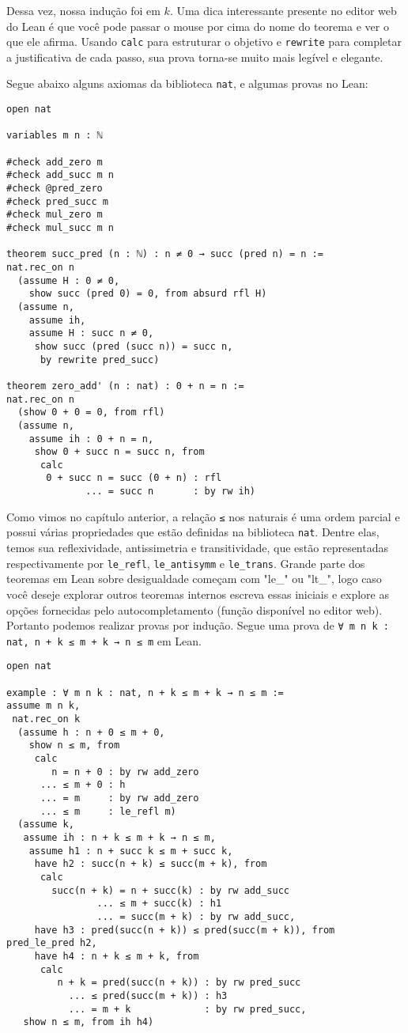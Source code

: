 \begin{center}
Dessa vez, nossa indução foi em $k$. Uma dica interessante presente no editor web do Lean é que você pode passar o mouse por cima do nome do teorema e ver o que ele afirma. Usando \lstinline{calc} para estruturar o objetivo e \lstinline{rewrite} para completar a justificativa de cada passo, sua prova torna-se muito mais legível e elegante.

Segue abaixo alguns axiomas da biblioteca \lstinline{nat}, e algumas provas no Lean:

\begin{lstlisting}
open nat

variables m n : ℕ

#check add_zero m
#check add_succ m n
#check @pred_zero
#check pred_succ m
#check mul_zero m
#check mul_succ m n

theorem succ_pred (n : ℕ) : n ≠ 0 → succ (pred n) = n :=
nat.rec_on n
  (assume H : 0 ≠ 0,
    show succ (pred 0) = 0, from absurd rfl H)
  (assume n,
    assume ih,
    assume H : succ n ≠ 0,
     show succ (pred (succ n)) = succ n,
      by rewrite pred_succ)

theorem zero_add' (n : nat) : 0 + n = n :=
nat.rec_on n
  (show 0 + 0 = 0, from rfl)
  (assume n,
    assume ih : 0 + n = n,
     show 0 + succ n = succ n, from
      calc
       0 + succ n = succ (0 + n) : rfl
              ... = succ n       : by rw ih)
\end{lstlisting}

Como vimos no capítulo anterior, a relação \lstinline{≤} nos naturais é uma ordem parcial e possui várias propriedades que estão definidas na biblioteca \lstinline{nat}. Dentre elas, temos sua reflexividade, antissimetria e transitividade, que estão representadas respectivamente por \lstinline{le_refl}, \lstinline{le_antisymm} e \lstinline{le_trans}. Grande parte dos teoremas em Lean sobre desigualdade começam com "le\_" ou "lt\_", logo caso você deseje explorar outros teoremas internos escreva essas iniciais e explore as opções fornecidas pelo autocompletamento (função disponível no editor web). Portanto podemos realizar provas por indução. Segue uma prova de \lstinline{∀ m n k : nat, n + k ≤ m + k → n ≤ m} em Lean.

\begin{lstlisting}
open nat

example : ∀ m n k : nat, n + k ≤ m + k → n ≤ m := 
assume m n k,
 nat.rec_on k 
  (assume h : n + 0 ≤ m + 0,
    show n ≤ m, from 
     calc
        n = n + 0 : by rw add_zero
      ... ≤ m + 0 : h
      ... = m     : by rw add_zero
      ... ≤ m     : le_refl m)
  (assume k,
   assume ih : n + k ≤ m + k → n ≤ m,
    assume h1 : n + succ k ≤ m + succ k,
     have h2 : succ(n + k) ≤ succ(m + k), from 
      calc
        succ(n + k) = n + succ(k) : by rw add_succ
                ... ≤ m + succ(k) : h1
                ... = succ(m + k) : by rw add_succ,
     have h3 : pred(succ(n + k)) ≤ pred(succ(m + k)), from pred_le_pred h2,
     have h4 : n + k ≤ m + k, from 
      calc
         n + k = pred(succ(n + k)) : by rw pred_succ
           ... ≤ pred(succ(m + k)) : h3
           ... = m + k             : by rw pred_succ, 
   show n ≤ m, from ih h4)
\end{lstlisting}


\end{center}
